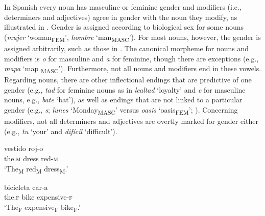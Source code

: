 \documentclass[output=paper,colorlinks,citecolor=brown,modfonts,nonflat]{../langscibook}
\begin{document}
In Spanish every noun has masculine or feminine gender and modifiers (i.e., determiners and adjectives) agree in gender with the noun they modify, as illustrated in . Gender is assigned according to biological sex for some nouns (\textit{mujer} ‘woman\textsubscript{FEM}’, \textit{hombre} ‘man\textsubscript{MASC}’). For most nouns, however, the gender is assigned arbitrarily, such as those in . The canonical morpheme for nouns and modifiers is \textit{o} for masculine and \textit{a} for feminine, though there are exceptions (e.g., \textit{mapa}\textsubscript{} ‘map\textsubscript{ MASC}’). Furthermore, not all nouns and modifiers end in these vowels. Regarding nouns, there are other inflectional endings that are predictive of one gender (e.g., \textit{tad} for feminine nouns as in \textit{lealtad} ‘loyalty’ and \textit{e} for masculine nouns, e.g., \textit{bate} ‘bat’), as well as endings that are not linked to a particular gender (e.g., \textit{s}; \textit{lunes} ‘Monday\textsubscript{MASC}’ versus \textit{oasis} ‘oasis\textsubscript{FEM}’; \citealt{TeschnerRussell1984}). Concerning modifiers, not all determiners and adjectives are overtly marked for gender either (e.g., \textit{tu} ‘your’ and \textit{difícil} ‘difficult’).


\ea\label{ex:gudmestad:1}
\ea
{} {vestido} {roj-o}\\
     the.\textsc{m} dress red-\textsc{m}\\
\glt ‘The\textsubscript{M} red\textsubscript{M} dress\textsubscript{M}.’

\ex
{} {bicicleta} {car-a}\\
    the.\textsc{f} bike expensive-\textsc{f}\\
\glt    ‘The\textsubscript{F} expensive\textsubscript{F} bike\textsubscript{F}.’
\z
\z
\end{document}
